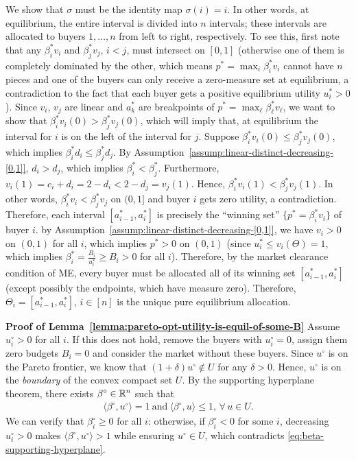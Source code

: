 		We show that $\sigma$ must be the identity map $\sigma(i) = i$. In other words, at equilibrium, the entire interval is divided into $n$ intervals; these intervals are allocated to buyers $1, \dots, n$ from left to right, respectively. To see this, first note that any $\beta^*_i v_i$ and $\beta^*_j v_j$, $i < j$, must intersect on $[0,1]$ (otherwise one of them is completely dominated by the other, which means $p^* = \max_i \beta^*_i v_i$ cannot have $n$ pieces and one of the buyers can only receive a zero-measure set at equilibrium, a contradiction to the fact that each buyer gets a positive equilibrium utility $u^*_i > 0$). 
		Since $v_i$, $v_j$ are linear and $a^*_k$ are breakpoints of $p^* = \max_\ell \beta^*_\ell v_\ell$, we want to show that $\beta^*_i v_i(0) > \beta^*_j v_j(0)$, which will imply that, at equilibrium the interval for $i$ is on the left of the interval for $j$. 
		Suppose $\beta^*_i v_i(0) \leq \beta^*_j v_j(0)$, which implies $\beta^*_i d_i \leq \beta^*_j d_j$. By Assumption~\ref{assump:linear-distinct-decreasing-[0,1]}, $d_i > d_j$, which implies $\beta^*_i < \beta^*_j$. Furthermore, $v_i(1) = c_i + d_i = 2- d_i < 2 - d_j = v_j(1)$.
		Hence, 
		$\beta^*_i v_i(1) < \beta^*_j v_j(1)$. 
		In other words, $\beta^*_i v_i < \beta^*_j v_j$ on $(0, 1]$ and buyer $i$ gets zero utility, a contradiction.
		Therefore, each interval $[a^*_{i-1}, a^*_i]$ is precisely the ``winning set'' $\{p^* = \beta^*_i v_i\}$ of buyer $i$. by Assumption~\ref{assump:linear-distinct-decreasing-[0,1]}, we have $v_i > 0$ on $(0,1)$ for all $i$, which implies $p^* > 0$ on $(0,1)$ (since $u^*_i \leq v_i(\Theta)=1$, which implies $\beta^*_i = \frac{B_i}{u^*_i} \geq B_i > 0$ for all $i$). Therefore, by the market clearance condition of ME, every buyer must be allocated all of its winning set $[a^*_{i-1}, a^*_i]$ (except possibly the endpoints, which have measure zero). 
		Therefore, $\Theta_i = [a^*_{i-1}, a^*_i]$, $i\in [n]$ is the unique pure equilibrium allocation. 
	

		\smallskip\noindent\textbf{Proof of Lemma~\ref{lemma:pareto-opt-utility-is-equil-of-some-B}}
		Assume $u^\circ_i>0$ for all $i$. 
	If this does not hold, remove the buyers with $u^\circ_i=0$, assign them zero budgets $B_i = 0$ and consider the market without these buyers. 
	Since $u^\circ$ is on the Pareto frontier, we know that $(1+\delta)u^\circ\notin U$ for any $\delta>0$. Hence, $u^\circ$ is on the \emph{boundary} of the convex compact set $U$. By the supporting hyperplane theorem, there exists $\beta^\circ\in \mathbb{R}^n$ such that 
	\begin{align}
		\langle \beta^\circ, u^\circ \rangle = 1\ \text{and}\ \langle \beta^\circ, u\rangle \leq 1,\, \forall\, u\in U.
		\label{eq:beta-supporting-hyperplane}
	\end{align}
	We can verify that $\beta^\circ_i \geq 0$ for all $i$: otherwise, if $\beta^\circ_i < 0$ for some $i$, decreasing $u^\circ_i >0$ makes $\langle \beta^\circ, u^\circ \rangle > 1$ while ensuring $u^\circ\in U$, which contradicts \eqref{eq:beta-supporting-hyperplane}.

